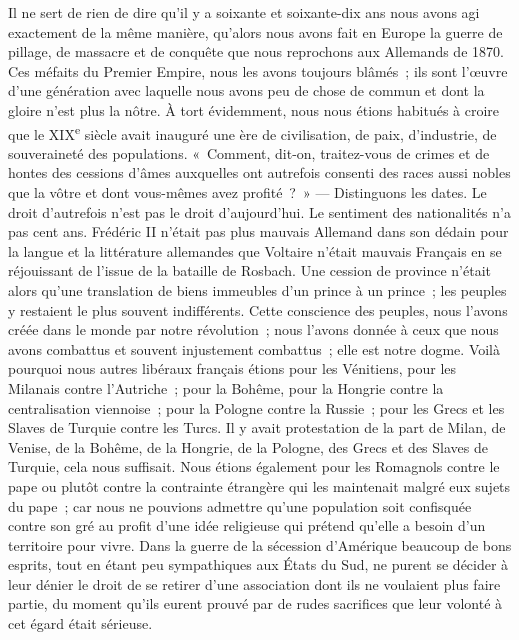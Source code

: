 \documentclass[french,twoside]{book} %
\begin{document}
Il ne sert de rien de dire qu’il y a soixante et soixante-dix ans nous avons agi exactement de la même manière, qu’alors nous avons fait en Europe la guerre de pillage, de massacre et de conquête que nous reprochons aux Allemands de 1870. Ces méfaits du Premier Empire, nous les avons toujours blâmés ; ils sont l’œuvre d’une génération avec laquelle nous avons peu de chose de commun et dont la gloire n’est plus la nôtre. À tort évidemment, nous nous étions habitués à croire que le XIX\textsuperscript{e} siècle avait inauguré une ère de civilisation, de paix, d’industrie, de souveraineté des populations. « Comment, dit-on, traitez-vous de crimes et de hontes des cessions d’âmes auxquelles ont autrefois consenti des races aussi nobles que la vôtre et dont vous-mêmes avez profité ? » — Distinguons les dates. Le droit d’autrefois n’est pas le droit d’aujourd’hui. Le sentiment des nationalités n’a pas cent ans. Frédéric II n’était pas plus mauvais Allemand dans son dédain pour la langue et la littérature allemandes que Voltaire n’était mauvais Français en se réjouissant de l’issue de la bataille de Rosbach. Une cession de province n’était alors qu’une translation de biens immeubles d’un prince à un prince ; les peuples y restaient le plus souvent indifférents. Cette conscience des peuples, nous l’avons créée dans le monde par notre révolution ; nous l’avons donnée à ceux que nous avons combattus et souvent injustement combattus ; elle est notre dogme. Voilà pourquoi nous autres libéraux français étions pour les Vénitiens, pour les Milanais contre l’Autriche ; pour la Bohême, pour la Hongrie contre la centralisation viennoise ; pour la Pologne contre la Russie ; pour les Grecs et les Slaves de Turquie contre les Turcs. Il y avait protestation de la part de Milan, de Venise, de la Bohême, de la Hongrie, de la Pologne, des Grecs et des Slaves de Turquie, cela nous suffisait. Nous étions également pour les Romagnols contre le pape ou plutôt contre la contrainte étrangère qui les maintenait malgré eux sujets du pape ; car nous ne pouvions admettre qu’une population soit confisquée contre son gré au profit d’une idée religieuse qui prétend qu’elle a besoin d’un territoire pour vivre. Dans la guerre de la sécession d’Amérique beaucoup de bons esprits, tout en étant peu sympathiques aux États du Sud, ne purent se décider à leur dénier le droit de se retirer d’une association dont ils ne voulaient plus faire partie, du moment qu’ils eurent prouvé par de rudes sacrifices que leur volonté à cet égard était sérieuse.\par
\end{document}
